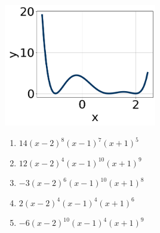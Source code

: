 \documentclass[14pt]{extbook}
\begin{document}
\begin{enumerate}
{\begin{center}
    \includegraphics[width=0.5\textwidth]{../Figures/polyGraphToFunctionCopyB.png}
\end{center}
\begin{enumerate}[label=\Alph*.]
\item \( 14(x - 2)^{8} (x - 1)^{7} (x + 1)^{5} \)
\item \( 12(x - 2)^{4} (x - 1)^{10} (x + 1)^{9} \)
\item \( -3(x - 2)^{6} (x - 1)^{10} (x + 1)^{8} \)
\item \( 2(x - 2)^{4} (x - 1)^{4} (x + 1)^{6} \)
\item \( -6(x - 2)^{10} (x - 1)^{4} (x + 1)^{9} \)


\end{enumerate}}
\end{enumerate}
\end{document}
